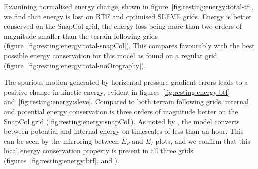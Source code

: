 Examining normalised energy change, shown in figure~\ref{fig:resting:energy:total-tf}, we find that energy is lost on BTF and optimised SLEVE grids.  Energy is better conserved on the SnapCol grid, the energy loss being more than two orders of magnitude smaller than the terrain following grids (figure~\ref{fig:resting:energy:total-snapCol}).  This compares favourably with the best possible energy conservation for this model as found on a regular grid (figure~\ref{fig:resting:energy:total-noOrography}).

The spurious motion generated by horizontal pressure gradient errors leads to a positive change in kinetic energy, evident in figures~\ref{fig:resting:energy:btf} and~\ref{fig:resting:energy:sleve}.  Compared to both terrain following grids, internal and potential energy conservation is three orders of magnitude better on the SnapCol grid (\ref{fig:resting:energy:snapCol}).  As noted by \textcite{weller-shahrokhi2014}, the model converts between potential and internal energy on timescales of less than an hour.  This can be seen by the mirroring between $E_P$ and $E_I$ plots, and we confirm that this local energy conservation property is present in all three grids (figures~\ref{fig:resting:energy:btf},  and ).




